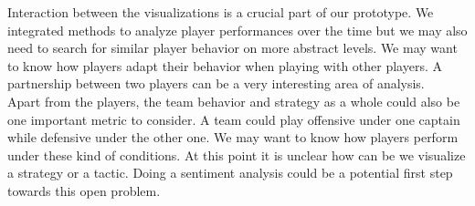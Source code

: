 \documentclass[10pt,journal,compsoc]{IEEEtran}
\begin{document}
\indent Interaction between the visualizations is a crucial part of our prototype. We integrated methods to analyze player performances over the time but we may also  need  to  search  for  similar  player  behavior  on  more abstract levels. We may want to know how players adapt their behavior when playing with other players. A partnership between two players can be a very interesting area of analysis. \\

\indent Apart from the players, the team behavior and strategy as a whole could also be one important metric to consider. A team could play offensive under one captain while defensive under the other one. We may want to know how players perform under these kind of conditions. At this point it is unclear how can be we visualize a strategy or a tactic. Doing a sentiment analysis could be a potential first step towards this open problem.



\end{document}
